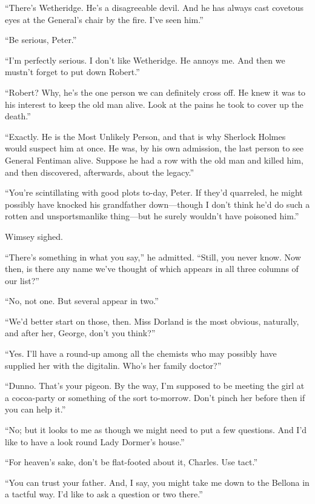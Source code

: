 \enquote{There's Wetheridge. He's a disagreeable devil. And he has always cast covetous eyes at the General's chair by the fire. I've seen him.}

\enquote{Be serious, Peter.}

\enquote{I'm perfectly serious. I don't like Wetheridge. He annoys me. And then we mustn't forget to put down Robert.}

\enquote{Robert? Why, he's the one person we can definitely cross off. He knew it was to his interest to keep the old man alive. Look at the pains he took to cover up the death.}

\enquote{Exactly. He is the Most Unlikely Person, and that is why Sherlock Holmes would suspect him at once. He was, by his own admission, the last person to see General Fentiman alive. Suppose he had a row with the old man and killed him, and then discovered, afterwards, about the legacy.}

\enquote{You're scintillating with good plots to-day, Peter. If they'd quarreled, he might possibly have knocked his grandfather down\allowbreak---\allowbreak though I don't think he'd do such a rotten and unsportsmanlike thing\allowbreak---\allowbreak but he surely wouldn't have poisoned him.}

Wimsey sighed.

\enquote{There's something in what you say,} he admitted. \enquote{Still, you never know. Now then, is there any name we've thought of which appears in all three columns of our list?}

\enquote{No, not one. But several appear in two.}

\enquote{We'd better start on those, then. Miss Dorland is the most obvious, naturally, and after her, George, don't you think?}

\enquote{Yes. I'll have a round-up among all the chemists who may possibly have supplied her with the digitalin. Who's her family doctor?}

\enquote{Dunno. That's your pigeon. By the way, I'm supposed to be meeting the girl at a cocoa-party or something of the sort to-morrow. Don't pinch her before then if you can help it.}

\enquote{No; but it looks to me as though we might need to put a few questions. And I'd like to have a look round Lady Dormer's house.}

\enquote{For heaven's sake, don't be flat-footed about it, Charles. Use tact.}

\enquote{You can trust your father. And, I say, you might take me down to the Bellona in a tactful way. I'd like to ask a question or two there.}

